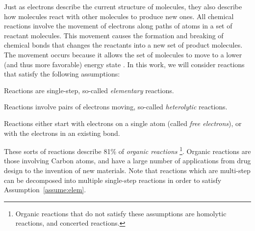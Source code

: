 Just as electrons describe the current structure of molecules, they also describe how molecules react with other molecules to produce new ones. 
All chemical reactions involve the movement of electrons along paths of atoms in a set of reactant molecules. 
This movement causes the formation and breaking of chemical bonds that changes the reactants into a new set of product molecules. The movement occurs because it allows the set of molecules to move to a lower (and thus more favorable) energy state .
In this work, we will consider reactions that satisfy the following assumptions:
\begin{assumption}
Reactions are single-step, so-called \emph{elementary} reactions.
\label{assume:elem}
\end{assumption}

\begin{assumption}
Reactions involve pairs of electrons moving, so-called \emph{heterolytic} reactions.
\label{assume:het}
\end{assumption}

\begin{assumption}
Reactions either start with electrons on a single atom (called \emph{free electrons}), or with the electrons in an existing bond.
\label{assume:atom_bond}
\end{assumption}

These sorts of reactions describe 81\% of \emph{organic reactions}\cite{herges1994coarctate} \footnote{Organic reactions that do not satisfy these assumptions are homolytic reactions, and concerted reactions.}.
Organic reactions are those involving Carbon atoms, and have a large number of applications from drug design to the invention of new materials\cite{segler2018planning}.
Note that reactions which are multi-step can be decomposed into multiple single-step reactions in order to satisfy Assumption~\ref{assume:elem}.

